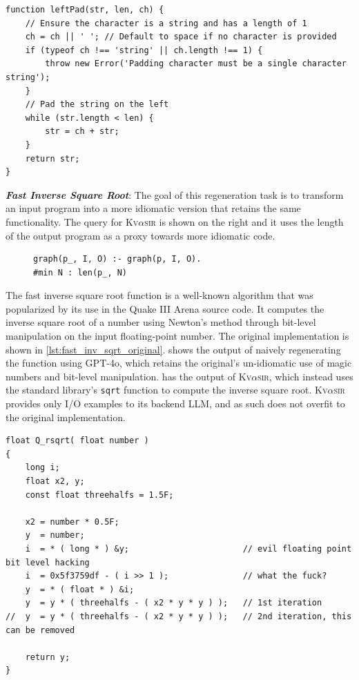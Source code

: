\documentclass[nonacm,sigplan,review]{acmart}
\def\gptmodel{{GPT-4o}\xspace}
\newcommand{\sys}{{\scshape Kv{$\alpha$}sir}\xspace}
\newcommand{\heading}[1]{\vspace{2pt}\noindent\textbf{\emph{#1}}:\enspace}
\newcommand{\ttt}[1]{\texttt{#1}\xspace}
\begin{document}
\begin{listing}[htpb]
  \begin{verbatim}
function leftPad(str, len, ch) {
    // Ensure the character is a string and has a length of 1
    ch = ch || ' '; // Default to space if no character is provided
    if (typeof ch !== 'string' || ch.length !== 1) {
        throw new Error('Padding character must be a single character string');
    }
    // Pad the string on the left
    while (str.length < len) {
        str = ch + str;
    }
    return str;
}
  \end{verbatim}
  \caption{The output of \sys, having regenerated \ttt{leftPad}.}
\end{listing}

\heading{Fast Inverse Square Root}
The goal of this regeneration task is to transform an input 
program into a more idiomatic version that retains the same functionality.
The query for \sys is shown on the right and it uses the length of the output program as a proxy towards 
more idiomatic code.
\begin{figure}
\begin{verbatim}
graph(p_, I, O) :- graph(p, I, O).
#min N : len(p_, N)
\end{verbatim}
\end{figure}
The fast inverse square root function is a well-known algorithm that was
popularized by its use in the Quake III Arena source code.
It computes the inverse square root of a number using 
Newton's method through bit-level manipulation on the input floating-point number.
The original implementation is shown in \cref{lst:fast_inv_sqrt_original}.
 shows the output of naively regenerating the function using \gptmodel,
which retains the original's un-idiomatic use of magic numbers and bit-level manipulation.
 has the output of \sys, which instead uses the standard library's
\ttt{sqrt} function to compute the inverse square root.
\sys provides only I/O examples to its backend LLM, and as such does not overfit to the original implementation.

\begin{listing}[htpb]
\begin{verbatim}
float Q_rsqrt( float number )
{
	long i;
	float x2, y;
	const float threehalfs = 1.5F;

	x2 = number * 0.5F;
	y  = number;
	i  = * ( long * ) &y;                       // evil floating point bit level hacking
	i  = 0x5f3759df - ( i >> 1 );               // what the fuck?
	y  = * ( float * ) &i;
	y  = y * ( threehalfs - ( x2 * y * y ) );   // 1st iteration
//	y  = y * ( threehalfs - ( x2 * y * y ) );   // 2nd iteration, this can be removed

	return y;
}
\end{verbatim}
  \caption{The original implementation of the fast inverse square root function 
  found in the Quake III source code~\cite{fast_inv_sqrt}}
  \label{lst:fast_inv_sqrt_original}
\end{listing}
\end{document}
